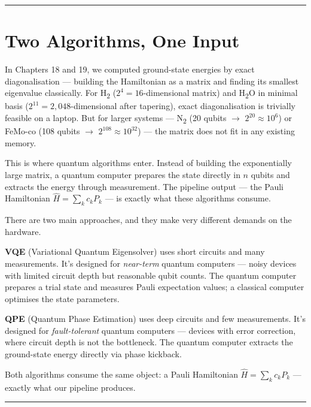 \documentclass[
  11pt,
  oneside]{book}
\begin{document}
\begin{center}\rule{0.5\linewidth}{0.5pt}\end{center}

\section{Two Algorithms, One Input}\label{two-algorithms-one-input}

In Chapters 18 and 19, we computed ground-state energies by exact
diagonalisation --- building the Hamiltonian as a matrix and finding its
smallest eigenvalue classically. For H\textsubscript{2} (\(2^4 = 16\)-dimensional
matrix) and H\textsubscript{2}O in minimal basis (\(2^{11} = 2{,}048\)-dimensional after
tapering), exact diagonalisation is trivially feasible on a laptop. But
for larger systems --- N\textsubscript{2} (20 qubits $\rightarrow$ \(2^{20} \approx 10^6\)) or
FeMo-co (108 qubits $\rightarrow$ \(2^{108} \approx 10^{32}\)) --- the matrix does
not fit in any existing memory.

This is where quantum algorithms enter. Instead of building the
exponentially large matrix, a quantum computer prepares the state
directly in \(n\) qubits and extracts the energy through measurement.
The pipeline output --- the Pauli Hamiltonian
\(\hat{H} = \sum_k c_k P_k\) --- is exactly what these algorithms
consume.

There are two main approaches, and they make very different demands on
the hardware.

\textbf{VQE} (Variational Quantum Eigensolver) uses short circuits and
many measurements. It's designed for \emph{near-term} quantum computers
--- noisy devices with limited circuit depth but reasonable qubit
counts. The quantum computer prepares a trial state and measures Pauli
expectation values; a classical computer optimises the state parameters.

\textbf{QPE} (Quantum Phase Estimation) uses deep circuits and few
measurements. It's designed for \emph{fault-tolerant} quantum computers
--- devices with error correction, where circuit depth is not the
bottleneck. The quantum computer extracts the ground-state energy
directly via phase kickback.

Both algorithms consume the same object: a Pauli Hamiltonian
\(\hat{H} = \sum_k c_k P_k\) --- exactly what our pipeline produces.

\begin{center}\rule{0.5\linewidth}{0.5pt}\end{center}
\end{document}
